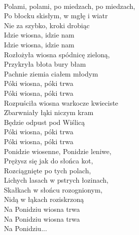 
\begin{flushleft}
\tab{}\tab{}\\
Polami, polami, po miedzach, po miedzach, \\
Po błocku skisłym, w mgłę i wiatr \\
Nie za szybko, kroki drobiąc \tab{}\\
Idzie wiosna, idzie nam \tab{}\\
Idzie wiosna, idzie nam \tab{}\\
\vskip 3mm
Rozłożyła wiosna spódnicę zieloną, \\
Przykryła błota bury błam \\
Pachnie ziemia ciałem młodym \\
Póki wiosna, póki trwa \\
Póki wiosna, póki trwa \\
\vskip 3mm
Rozpuściła wiosna warkocze kwieciste \\
Zbarwniały łąki niczym kram \\
Będzie odpust pod Wiślicą \\
Póki wiosna, póki trwa \\
Póki wiosna, póki trwa \\
\vskip 3mm
Ponidzie wiosenne, Ponidzie leniwe,  \\
Prężysz się jak do słońca kot, \tab{}\\
Rozciągnięte po tych polach, \tab{}\\
Lichych lasach w pstrych łozinach, \\
Skałkach w słońcu rozognionym, \\
Nidą w łąkach roziskrzoną \tab{}\\
Na Ponidziu wiosna trwa \tab{}\\
Na Ponidziu wiosna trwa \tab{}\\
Na Ponidziu...  \tab{}\tab{}\\
\end{flushleft}
\clearpage
